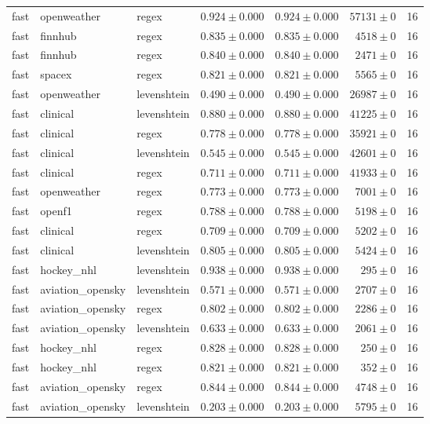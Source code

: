 \begin{table}[htbp]
\begin{tabular}{l l l r r r r}
fast & openweather & regex & $0.924\pm0.000$ & $0.924\pm0.000$ & $57131\pm0$ & 16 \\
fast & finnhub & regex & $0.835\pm0.000$ & $0.835\pm0.000$ & $4518\pm0$ & 16 \\
fast & finnhub & regex & $0.840\pm0.000$ & $0.840\pm0.000$ & $2471\pm0$ & 16 \\
fast & spacex & regex & $0.821\pm0.000$ & $0.821\pm0.000$ & $5565\pm0$ & 16 \\
fast & openweather & levenshtein & $0.490\pm0.000$ & $0.490\pm0.000$ & $26987\pm0$ & 16 \\
fast & clinical & levenshtein & $0.880\pm0.000$ & $0.880\pm0.000$ & $41225\pm0$ & 16 \\
fast & clinical & regex & $0.778\pm0.000$ & $0.778\pm0.000$ & $35921\pm0$ & 16 \\
fast & clinical & levenshtein & $0.545\pm0.000$ & $0.545\pm0.000$ & $42601\pm0$ & 16 \\
fast & clinical & regex & $0.711\pm0.000$ & $0.711\pm0.000$ & $41933\pm0$ & 16 \\
fast & openweather & regex & $0.773\pm0.000$ & $0.773\pm0.000$ & $7001\pm0$ & 16 \\
fast & openf1 & regex & $0.788\pm0.000$ & $0.788\pm0.000$ & $5198\pm0$ & 16 \\
fast & clinical & regex & $0.709\pm0.000$ & $0.709\pm0.000$ & $5202\pm0$ & 16 \\
fast & clinical & levenshtein & $0.805\pm0.000$ & $0.805\pm0.000$ & $5424\pm0$ & 16 \\
fast & hockey\_nhl & levenshtein & $0.938\pm0.000$ & $0.938\pm0.000$ & $295\pm0$ & 16 \\
fast & aviation\_opensky & levenshtein & $0.571\pm0.000$ & $0.571\pm0.000$ & $2707\pm0$ & 16 \\
fast & aviation\_opensky & regex & $0.802\pm0.000$ & $0.802\pm0.000$ & $2286\pm0$ & 16 \\
fast & aviation\_opensky & levenshtein & $0.633\pm0.000$ & $0.633\pm0.000$ & $2061\pm0$ & 16 \\
fast & hockey\_nhl & regex & $0.828\pm0.000$ & $0.828\pm0.000$ & $250\pm0$ & 16 \\
fast & hockey\_nhl & regex & $0.821\pm0.000$ & $0.821\pm0.000$ & $352\pm0$ & 16 \\
fast & aviation\_opensky & regex & $0.844\pm0.000$ & $0.844\pm0.000$ & $4748\pm0$ & 16 \\
fast & aviation\_opensky & levenshtein & $0.203\pm0.000$ & $0.203\pm0.000$ & $5795\pm0$ & 16 \\

\end{tabular}
\end{table}
